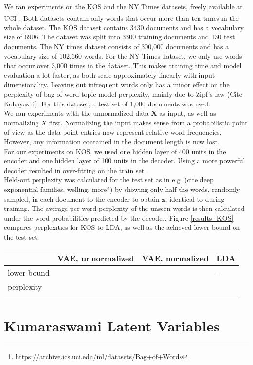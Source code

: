 \documentclass{report}
\begin{document}
	We ran experiments on the KOS and the NY Times datasets, freely available at UCI\footnote{https://archive.ics.uci.edu/ml/datasets/Bag+of+Words}. Both datasets contain only words that occur more than ten times in the whole dataset. The KOS dataset contains 3430 documents and has a vocabulary size of 6906. The dataset was split into 3300 training documents and 130 test documents. The NY times dataset consists of 300,000 documents and has a vocabulary size of 102,660 words. For the NY Times dataset, we only use words that occur over 3,000 times in the dataset. This makes training time and model evaluation a lot faster, as both scale approximately linearly with input dimensionality. Leaving out infrequent words only has a minor effect on the perplexity of bag-of-word topic model perplexity, mainly due to Zipf's law (Cite Kobayashi). For this dataset, a test set of 1,000 documents was used.
	\\
	We ran experiments with the unnormalized data $\mathbf{X}$ as input, as well as normalizing $X$ first. Normalizing the input makes sense from a probabilistic point of view as the data point entries now represent relative word frequencies. However, any information contained in the document length is now lost. 
	\\
	For our experiments on KOS, we used one hidden layer of 400 units in the encoder and one hidden layer of 100 units in the decoder.  Using a more powerful decoder resulted in over-fitting on the train set. 
	\\
	Held-out perplexity was calculated for the test set as in e.g. (cite deep exponential families, welling, more?) by showing only half the words, randomly sampled, in each document to the encoder to obtain $\mathbf{z}$, identical to during training. The average per-word perplexity of the unseen words is then calculated under the word-probabilities predicted by the decoder.  Figure \ref{results_KOS} compares perplexities for KOS to LDA, as well as the achieved lower bound on the test set.
	\\
	
	
	\begin{tabular}{l|l|l|l}
		& VAE, unnormalized & VAE, normalized & LDA  \\
		\hline
		lower bound & & & - \\
		\hline
		perplexity & & & \\
		\label{results_KOS}
	\end{tabular}

\chapter{Kumaraswami Latent Variables}
\end{document}
